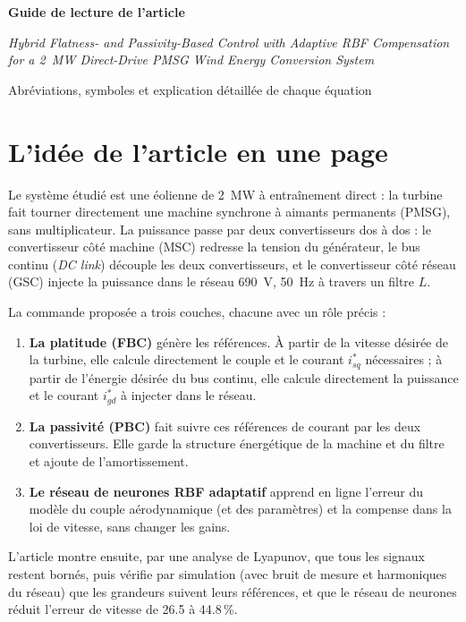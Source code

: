 \documentclass[11pt,a4paper]{article}
\begin{document}
\begin{center}
{\Large\bfseries Guide de lecture de l'article\par}
\vspace{4pt}
{\large\itshape Hybrid Flatness- and Passivity-Based Control with Adaptive RBF Compensation\\
for a 2~MW Direct-Drive PMSG Wind Energy Conversion System\par}
\vspace{6pt}
{\normalsize Abréviations, symboles et explication détaillée de chaque équation\par}
\end{center}

\tableofcontents

\section{L'idée de l'article en une page}
Le système étudié est une éolienne de 2~MW à entraînement direct : la turbine fait tourner directement
une machine synchrone à aimants permanents (PMSG), sans multiplicateur. La puissance passe par deux
convertisseurs dos à dos : le convertisseur côté machine (MSC) redresse la tension du générateur, le bus
continu (\emph{DC link}) découple les deux convertisseurs, et le convertisseur côté réseau (GSC) injecte la
puissance dans le réseau 690~V, 50~Hz à travers un filtre $L$.

La commande proposée a trois couches, chacune avec un rôle précis :
\begin{enumerate}[itemsep=2pt]
\item \textbf{La platitude (FBC)} génère les références. À partir de la vitesse désirée de la turbine, elle
calcule directement le couple et le courant $i_{sq}^*$ nécessaires ; à partir de l'énergie désirée du bus
continu, elle calcule directement la puissance et le courant $i_{gd}^*$ à injecter dans le réseau.
\item \textbf{La passivité (PBC)} fait suivre ces références de courant par les deux convertisseurs. Elle
garde la structure énergétique de la machine et du filtre et ajoute de l'amortissement.
\item \textbf{Le réseau de neurones RBF adaptatif} apprend en ligne l'erreur du modèle du couple
aérodynamique (et des paramètres) et la compense dans la loi de vitesse, sans changer les gains.
\end{enumerate}
L'article montre ensuite, par une analyse de Lyapunov, que tous les signaux restent bornés, puis vérifie
par simulation (avec bruit de mesure et harmoniques du réseau) que les grandeurs suivent leurs références,
et que le réseau de neurones réduit l'erreur de vitesse de 26.5 à 44.8\,\%.
\end{document}
